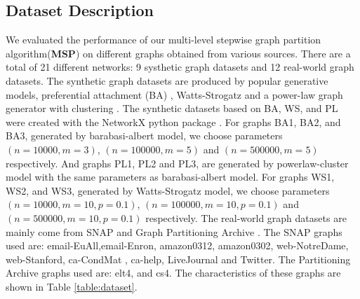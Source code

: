 \documentclass{acm_proc_article-sp}
\begin{document}
\subsection{Dataset Description}
We evaluated the performance of our multi-level stepwise graph partition algorithm(\textbf{MSP}) on  different graphs obtained from various sources. There are a total of 21 different networks: 9 systhetic graph datasets and 12 real-world graph datasets. The synthetic graph datasets are produced by popular generative models, preferential attachment (BA) \cite{barabasi:emergence}, Watts-Strogatz \cite{small-world-watts-strogatz} and a power-law graph generator with clustering \cite{Holme2002}. The synthetic datasets based on BA, WS, and PL were created with the NetworkX python package \cite{url:networkx}. For graphs BA1, BA2, and BA3, generated by barabasi-albert model, we choose parameters $(n=10000, m=3)$, $(n=100000, m=5)$ and $(n=500000, m=5)$ respectively. And graphs PL1, PL2 and PL3, are generated by powerlaw-cluster model with the same parameters as barabasi-albert model. For graphs WS1, WS2, and WS3, generated by Watts-Strogatz model, we choose parameters $(n=10000, m=10, p=0.1)$, $(n=100000, m=10, p=0.1)$ and $(n=500000, m=10, p=0.1)$ respectively. The real-world graph datasets  are mainly come from SNAP\cite{url:snap} and Graph Partitioning Archive \cite{url:gpa}. The SNAP graphs used are: email-EuAll,email-Enron, amazon0312, amazon0302, web-NotreDame, web-Stanford, ca-CondMat , ca-help, LiveJournal and Twitter. The Partitioning Archive graphs used are:  elt4, and cs4. The characteristics of these graphs are shown in Table \ref{table:dataset}.
\end{document}
